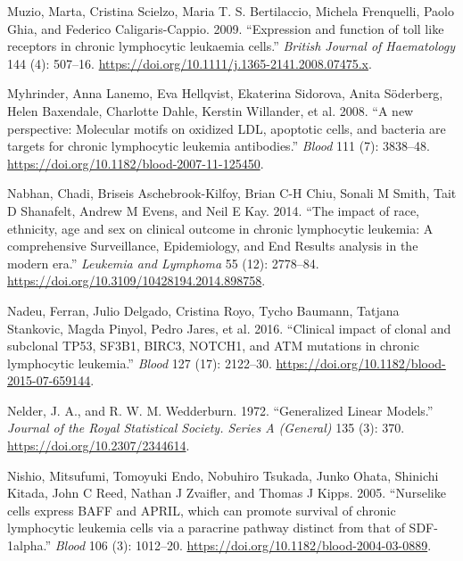 \documentclass[11pt, a4paper, twosided]{book}
\newenvironment{CSLReferences}%
  {}%
  {\par}
\begin{document}
\begin{CSLReferences}{1}{0}
\leavevmode{}%
Muzio, Marta, Cristina Scielzo, Maria T. S. Bertilaccio, Michela Frenquelli, Paolo Ghia, and Federico Caligaris-Cappio. 2009. {``{Expression and function of toll like receptors in chronic lymphocytic leukaemia cells}.''} \emph{British Journal of Haematology} 144 (4): 507--16. \url{https://doi.org/10.1111/j.1365-2141.2008.07475.x}.

\leavevmode{}%
Myhrinder, Anna Lanemo, Eva Hellqvist, Ekaterina Sidorova, Anita Söderberg, Helen Baxendale, Charlotte Dahle, Kerstin Willander, et al. 2008. {``{A new perspective: Molecular motifs on oxidized LDL, apoptotic cells, and bacteria are targets for chronic lymphocytic leukemia antibodies}.''} \emph{Blood} 111 (7): 3838--48. \url{https://doi.org/10.1182/blood-2007-11-125450}.

\leavevmode{}%
Nabhan, Chadi, Briseis Aschebrook-Kilfoy, Brian C-H Chiu, Sonali M Smith, Tait D Shanafelt, Andrew M Evens, and Neil E Kay. 2014. {``{The impact of race, ethnicity, age and sex on clinical outcome in chronic lymphocytic leukemia: A comprehensive Surveillance, Epidemiology, and End Results analysis in the modern era}.''} \emph{Leukemia and Lymphoma} 55 (12): 2778--84. \url{https://doi.org/10.3109/10428194.2014.898758}.

\leavevmode{}%
Nadeu, Ferran, Julio Delgado, Cristina Royo, Tycho Baumann, Tatjana Stankovic, Magda Pinyol, Pedro Jares, et al. 2016. {``{Clinical impact of clonal and subclonal TP53, SF3B1, BIRC3, NOTCH1, and ATM mutations in chronic lymphocytic leukemia.}''} \emph{Blood} 127 (17): 2122--30. \url{https://doi.org/10.1182/blood-2015-07-659144}.

\leavevmode{}%
Nelder, J. A., and R. W. M. Wedderburn. 1972. {``{Generalized Linear Models}.''} \emph{Journal of the Royal Statistical Society. Series A (General)} 135 (3): 370. \url{https://doi.org/10.2307/2344614}.

\leavevmode{}%
Nishio, Mitsufumi, Tomoyuki Endo, Nobuhiro Tsukada, Junko Ohata, Shinichi Kitada, John C Reed, Nathan J Zvaifler, and Thomas J Kipps. 2005. {``{Nurselike cells express BAFF and APRIL, which can promote survival of chronic lymphocytic leukemia cells via a paracrine pathway distinct from that of SDF-1alpha.}''} \emph{Blood} 106 (3): 1012--20. \url{https://doi.org/10.1182/blood-2004-03-0889}.


\end{CSLReferences}
\end{document}
